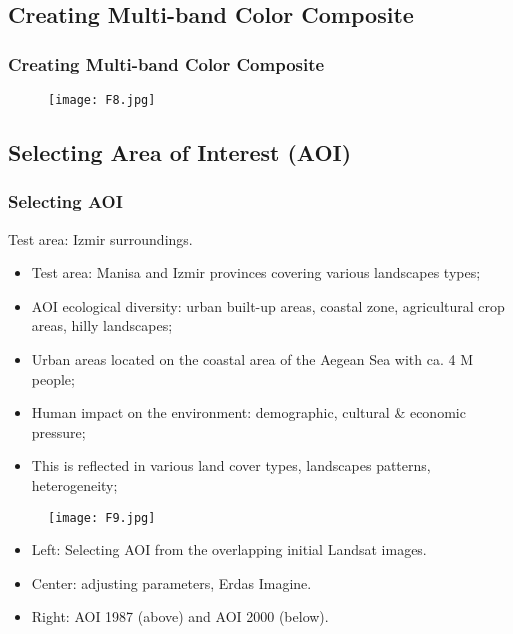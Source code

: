\documentclass[pdflatex,compress,8pt,
	xcolor={dvipsnames,dvipsnames,svgnames,x11names,table},
	hyperref={
	breaklinks = true, 
	pdfauthor={Lemenkova Polina}, 
	pdfsubject={Preentation}, 
	pdfcreator={Lemenkova Polina}, 
	pdfproducer={Lemenkova Polina}, 
	citecolor=NavyBlue, 
	urlbordercolor=cyan,
	urlcolor = NavyBlue, 
	breaklinks = true}]{beamer}
\begin{document}
\subsection{Creating Multi-band Color Composite}
\begin{frame}\frametitle{Creating Multi-band Color Composite}
\begin{figure}[H]
	\centering
		\texttt{[image: F8.jpg]}
\end{figure}
\end{frame}

\subsection{Selecting Area of Interest (AOI)}
\begin{frame}\frametitle{Selecting AOI}
Test area: Izmir surroundings.
\begin{itemize}
	\item Test area: Manisa and Izmir provinces covering various landscapes types;
	\item AOI ecological diversity: urban built-up areas, coastal zone, agricultural crop areas, hilly landscapes;
	\item Urban areas located on the coastal area of the Aegean Sea with ca. 4 M people;
	\item Human impact on the environment: demographic, cultural \& economic pressure;
	\item This is reflected in various land cover types, landscapes patterns, heterogeneity;
\end{itemize}
\begin{figure}[H]
	\centering
		\texttt{[image: F9.jpg]}
\end{figure}
\begin{itemize}
	\item Left: Selecting AOI from the overlapping initial Landsat images. 
	\item Center: adjusting parameters, Erdas Imagine.
	\item Right: AOI 1987 (above) and AOI 2000 (below).
\end{itemize}
\end{frame}
\end{document}
